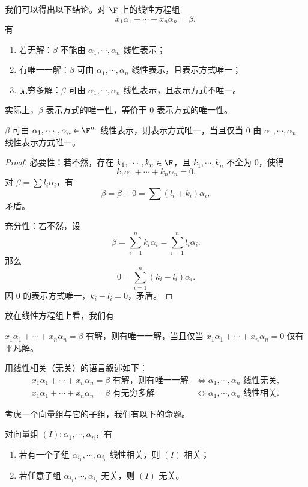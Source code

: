 我们可以得出以下结论。对 $\F$ 上的线性方程组
\[
x_1\alpha_1+\cdots+x_n\alpha_n=\beta,
\]
有
\begin{enumerate}
	\item 若无解：$\beta$ 不能由 $\alpha_1,\cdots,\alpha_n$ 线性表示；
	\item 有唯一一解：$\beta$ 可由 $\alpha_1,\cdots,\alpha_n$ 线性表示，且表示方式唯一；
	\item 无穷多解：$\beta$ 可由 $\alpha_1,\cdots,\alpha_n$ 线性表示，且表示方式不唯一。
\end{enumerate}

实际上，$\beta$ 表示方式的唯一性，等价于 $0$ 表示方式的唯一性。

\begin{proposition}
	$\beta$ 可由 $\alpha_1,\cdots,\alpha_n\in\F^m$ 线性表示，则表示方式唯一，当且仅当 $0$ 由 $\alpha_1,\cdots,\alpha_n$ 线性表示方式唯一。
\end{proposition}
\begin{proof}
	必要性：若不然，存在 $k_1,\cdots,k_n\in\F$，且 $k_1,\cdots,k_n$ 不全为 $0$，使得
	\[
	k_1\alpha_1+\cdots+k_n\alpha_n=0.
	\]
	对 $\beta=\sum l_i\alpha_i$，有
	\[
	\beta=\beta+0=\sum (l_i+k_i)\alpha_i,
	\]
	矛盾。
	
	充分性：若不然，设
	\[
	\beta=\sum_{i=1}^n k_i\alpha_i=
	\sum_{i=1}^n l_i\alpha_i.
	\]
	那么
	\[
	0=\sum_{i=1}^n(k_i-l_i)\alpha_i.
	\]
	因 $0$ 的表示方式唯一，$k_i-l_i=0$，矛盾。
\end{proof}

放在线性方程组上看，我们有
\begin{corollary}
	$x_1\alpha_1+\cdots+x_n\alpha_n=\beta$ 有解，则有唯一一解，当且仅当
	$x_1\alpha_1+\cdots+x_n\alpha_n=0$ 仅有平凡解。
\end{corollary}

用线性相关（无关）的语言叙述如下：
\[
\begin{aligned}
	x_1\alpha_1+\cdots+x_n\alpha_n=\beta\text{ 有解，则有唯一一解}
	&\Longleftrightarrow \alpha_1,\cdots,\alpha_n\text{ 线性无关},\\
	x_1\alpha_1+\cdots+x_n\alpha_n=\beta\text{ 有无穷多解}
	&\Longleftrightarrow \alpha_1,\cdots,\alpha_n\text{ 线性相关}.
\end{aligned}
\]

考虑一个向量组与它的子组，我们有以下的命题。

\begin{proposition}
	对向量组 $(I):\alpha_1,\cdots,\alpha_n$，有
	\begin{enumerate}
		\item 若有一个子组 $\alpha_{i_1},\cdots,\alpha_{i_r}$ 线性相关，则 $(I)$ 相关；
		\item 若任意子组 $\alpha_{i_1},\cdots,\alpha_{i_r}$ 无关，则 $(I)$ 无关。
	\end{enumerate}
\end{proposition}

